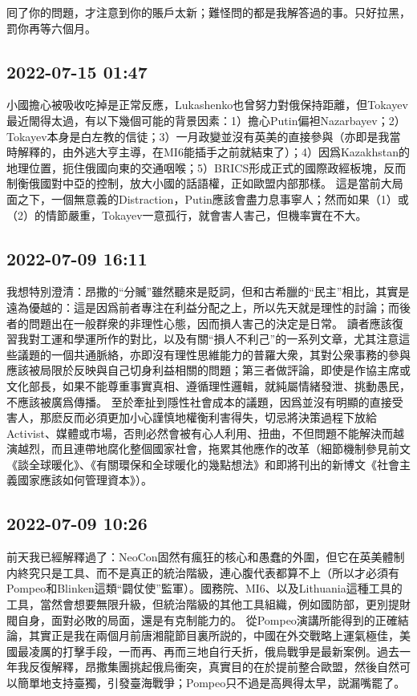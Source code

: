 \documentclass[twocolumn]{ctexart}
\begin{document}
囘了你的問題，才注意到你的賬戶太新；難怪問的都是我解答過的事。只好拉黑，罰你再等六個月。
\subsection*{2022-07-15 01:47}

小國擔心被吸收吃掉是正常反應，Lukashenko也曾努力對俄保持距離，但Tokayev最近閙得太過，有以下幾個可能的背景因素：1）擔心Putin偏袒Nazarbayev；2）Tokayev本身是白左教的信徒；3）一月政變並沒有英美的直接參與（亦即是我當時解釋的，由外逃大亨主導，在MI6能插手之前就結束了）；4）因爲Kazakhstan的地理位置，扼住俄國向東的交通咽喉；5）BRICS形成正式的國際政經板塊，反而制衡俄國對中亞的控制，放大小國的話語權，正如歐盟内部那樣。
這是當前大局面之下，一個無意義的Distraction，Putin應該會盡力息事寧人；然而如果（1）或（2）的情節嚴重，Tokayev一意孤行，就會害人害己，但機率實在不大。
\subsection*{2022-07-09 16:11}

我想特別澄清：昂撒的“分贓”雖然聽來是貶詞，但和古希臘的“民主”相比，其實是遠為優越的：這是因爲前者專注在利益分配之上，所以先天就是理性的討論；而後者的問題出在一般群衆的非理性心態，因而損人害己的決定是日常。
讀者應該復習我對工運和學運所作的對比，以及有關“損人不利己”的一系列文章，尤其注意這些議題的一個共通脈絡，亦即沒有理性思維能力的普羅大衆，其對公衆事務的參與應該被局限於反映與自己切身利益相關的問題；第三者做評論，即使是作協主席或文化部長，如果不能尊重事實真相、遵循理性邏輯，就純屬情緒發泄、挑動愚民，不應該被廣爲傳播。
至於牽扯到隱性社會成本的議題，因爲並沒有明顯的直接受害人，那麽反而必須更加小心謹慎地權衡利害得失，切忌將決策過程下放給Activist、媒體或市場，否則必然會被有心人利用、扭曲，不但問題不能解決而越演越烈，而且連帶地腐化整個國家社會，拖累其他應作的改革（細節機制參見前文《談全球暖化》、《有關環保和全球暖化的幾點想法》和即將刊出的新博文《社會主義國家應該如何管理資本》）。
\subsection*{2022-07-09 10:26}

前天我已經解釋過了：NeoCon固然有瘋狂的核心和愚蠢的外圍，但它在英美體制内終究只是工具、而不是真正的統治階級，連心腹代表都算不上（所以才必須有Pompeo和Blinken這類“闢仗使”監軍）。國務院、MI6、以及Lithuania這種工具的工具，當然會想要無限升級，但統治階級的其他工具組織，例如國防部，更別提財閥自身，面對必敗的局面，還是有克制能力的。
從Pompeo演講所能得到的正確結論，其實正是我在兩個月前唐湘龍節目裏所説的，中國在外交戰略上運氣極佳，美國最凌厲的打擊手段，一而再、再而三地自行夭折，俄烏戰爭是最新案例。過去一年我反復解釋，昂撒集團挑起俄烏衝突，真實目的在於提前整合歐盟，然後自然可以簡單地支持臺獨，引發臺海戰爭；Pompeo只不過是高興得太早，説漏嘴罷了。
\end{document}
